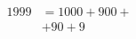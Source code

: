 \documentclass{article}
\begin{document}
\vspace*{\fill} \vspace*{-5ex}
\begin{equation}
\begin{split}
1999&=1000+900+{}\\
&+90+9
\end{split}
\end{equation}
\vspace*{\fill}
\end{document}
